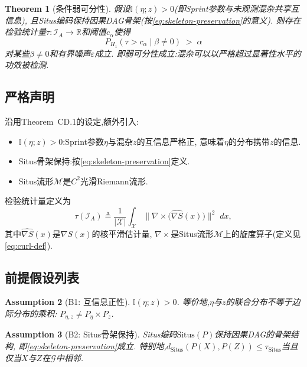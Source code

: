 \documentclass[12pt,a4paper]{article}
\newtheorem{theorem}{Theorem}[section]
\newtheorem{assumption}[theorem]{Assumption}
\newcommand{\R}{\mathbb{R}}
\newcommand{\I}{\mathbb{I}}
\newcommand{\cX}{\mathcal{X}}
\newcommand{\cG}{\mathcal{G}}
\newcommand{\cI}{\mathcal{I}}
\newcommand{\cM}{\mathcal{M}}
\newcommand{\Situs}{\mathrm{Situs}}
\newcommand{\curl}{\nabla\! \times\!}
\newcommand{\defeq}{\triangleq}
\begin{document}
\begin{theorem}[条件弱可分性]\label{thm:weak-sep}
    假设$\I(\eta; z) > 0$(即Sprint参数与未观测混杂共享互信息),
    且Situs编码保持因果DAG骨架(按\eqref{eq:skeleton-preservation}的意义).
    则存在检验统计量$\tau: \cI_A \to \R$和阈值$c_\alpha$使得
    \begin{equation}\label{eq:weak-sep-power}
        P_{H_1}(\tau > c_\alpha \mid \beta \neq 0) \;>\; \alpha
    \end{equation}
    对某些$\beta \neq 0$和有界噪声$\varepsilon$成立.
    即弱可分性成立:混杂可以以严格超过显著性水平的功效被检测.
\end{theorem}

\subsection{严格声明}

沿用Theorem~CD.1的设定,额外引入:
\begin{itemize}
    \item $\I(\eta; z) > 0$:Sprint参数$\eta$与混杂$z$的互信息严格正,
          意味着$\eta$的分布携带$z$的信息.
    \item Situs骨架保持:按\eqref{eq:skeleton-preservation}定义.
    \item Situs流形$\cM$是$C^2$光滑Riemann流形.
\end{itemize}

检验统计量定义为
\begin{equation}\label{eq:tau-def-formal}
    \tau(\cI_A) \defeq \frac{1}{|\cX|}\int_{\cX}
    \big\|\curl\big(\widehat{\nabla S}(x)\big)\big\|^2 \;dx,
\end{equation}
其中$\widehat{\nabla S}(x)$是$\nabla S(x)$的核平滑估计量,
$\curl$是Situs流形$\cM$上的旋度算子(定义见\eqref{eq:curl-def}).

\subsection{前提假设列表}

\begin{assumption}[B1: 互信息正性]\label{ass:B1}
    $\I(\eta; z) > 0$.
    等价地,$\eta$与$z$的联合分布不等于边际分布的乘积:
    $P_{\eta,z} \neq P_\eta \times P_z$.
\end{assumption}

\begin{assumption}[B2: Situs骨架保持]\label{ass:B2}
    Situs编码$\Situs(P)$保持因果DAG的骨架结构,
    即\eqref{eq:skeleton-preservation}成立.
    特别地,$d_{\Situs}(P(X), P(Z)) \leq \tau_{\Situs}$当且仅当$X$与$Z$在$\cG$中相邻.
\end{assumption}
\end{document}
